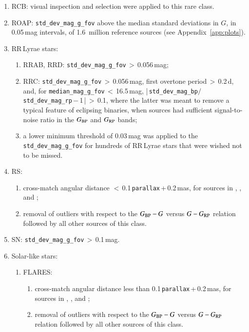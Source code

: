 \documentclass[longauth]{aa}
\def\g{$G$\xspace}
\def\bp{$G_{\rm BP}$\xspace}
\def\rp{$G_{\rm RP}$\xspace}
\def\bpg{\mbox{$G_{\rm BP}-G$}\xspace}
\def\grp{\mbox{$G-G_{\rm RP}$}\xspace}
\begin{document}
\begin{appendix}
\begin{enumerate}
  \item RCB: visual inspection and selection were applied to this rare class.
  \item ROAP: \texttt{std\_dev\_mag\_g\_fov} above the median standard deviations in \g, in 0.05\,mag intervals, of 1.6~million reference sources (see Appendix~\ref{app:plots}).
  \item RR\,Lyrae stars:
  \begin{enumerate}
  \item RRAB, RRD: \texttt{std\_dev\_mag\_g\_fov}\,$>$\,0.056\,mag;
  \item RRC: \texttt{std\_dev\_mag\_g\_fov}\,$>$\,0.056\,mag, first overtone period\,$>$\,0.2\,d, and, for \texttt{median\_mag\_g\_fov}\,$<$\,16.5\,mag, |\,\texttt{std\_dev\_mag\_bp}$/$\texttt{std\_dev\_mag\_rp}\,$-$\,1\,|\,$>$\,0.1, where the latter was meant to remove a typical feature of eclipsing binaries, when sources had sufficient signal-to-noise ratio in the \bp and \rp bands;
  \item a lower minimum threshold of 0.03\,mag was applied to the \texttt{std\_dev\_mag\_g\_fov} for hundreds of RR\,Lyrae stars that were wished not to be missed.
  \end{enumerate}
  \item RS: 
    \begin{enumerate}
    \item cross-match angular distance $<$\,0.1\,\texttt{parallax}\,+\,0.2\,mas, for sources in \citet{2020ApJS..249...18C}, \citet{2008MNRAS.389.1722E}, and  \citet{2006SASS...25...47W};
    \item removal of outliers with respect to the \bpg versus \grp relation followed by all other sources of this class.
    \end{enumerate}
  \item SN: \texttt{std\_dev\_mag\_g\_fov}\,$>$\,0.1\,mag.
  \item Solar-like stars:
    \begin{enumerate}
    \item FLARES: 
      \begin{enumerate}
        \item cross-match angular distance less than 0.1\,\texttt{parallax}\,+\,0.2\,mas, for sources in \citet{2013ApJS..209....5S}, \citet{2011AJ....141...50W}, and \citet{2015ApJ...798...92W};
        \item removal of outliers with respect to the \bpg versus \grp relation followed by all other sources of this class.
      \end{enumerate}

\end{enumerate}
\end{enumerate}
\end{appendix}
\end{document}
